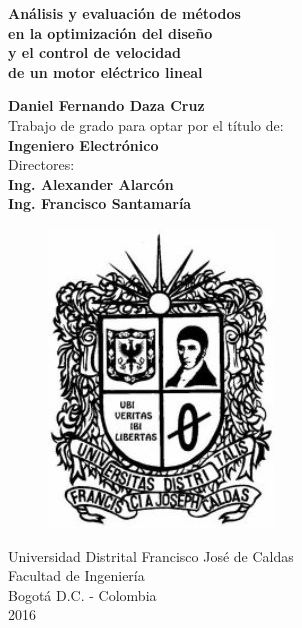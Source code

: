 \begin{titlepage}

\begin{center}

\begin{Large}
\textbf{Análisis y evaluación de métodos\\en la optimización del diseño\\y el control de velocidad\\de un motor eléctrico lineal} \\
\end{Large}
\vspace*{0.6in}
\textbf{Daniel Fernando Daza Cruz}\\

\vspace*{0.3in}
Trabajo de grado para optar por el título de:\\
\vspace*{0.1in}
\textbf{Ingeniero Electrónico} \\
\vspace*{1in}
Directores:\\
\vspace*{0.1in}
\textbf{Ing. Alexander Alarcón}\\
\textbf{Ing. Francisco Santamaría}\\
\vspace*{1in}
\vspace*{0.2in}
\begin{figure}[htb]
\begin{center}
\includegraphics[scale=0.4]{logo}
\end{center}
\end{figure}
Universidad Distrital Francisco José de Caldas\\
Facultad de Ingeniería\\
Bogotá D.C. - Colombia\\
2016
\end{center}
\end{titlepage}
\newpage

